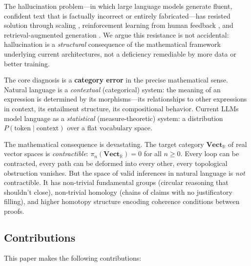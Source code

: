 \documentclass[11pt,a4paper,twocolumn]{article}
\theoremstyle{plain}
\theoremstyle{definition}
\newcommand{\Vect}{\mathbf{Vect}}
\begin{document}
The hallucination problem---in which large language models generate fluent, confident text that is factually incorrect or entirely fabricated---has resisted solution through scaling \cite{openai2023gpt4}, reinforcement learning from human feedback \cite{ouyang2022training}, and retrieval-augmented generation \cite{lewis2020retrieval}. We argue this resistance is not accidental: hallucination is a \emph{structural} consequence of the mathematical framework underlying current architectures, not a deficiency remediable by more data or better training.

The core diagnosis is a \textbf{category error} in the precise mathematical sense. Natural language is a \emph{contextual} (categorical) system: the meaning of an expression is determined by its morphisms---its relationships to other expressions in context, its entailment structure, its compositional behavior. Current LLMs model language as a \emph{statistical} (measure-theoretic) system: a distribution $P(\text{token} \mid \text{context})$ over a flat vocabulary space.

The mathematical consequence is devastating. The target category $\Vect_{\mathbb{R}}$ of real vector spaces is \emph{contractible}: $\pi_n(\Vect_{\mathbb{R}}) = 0$ for all $n \geq 0$. Every loop can be contracted, every path can be deformed into every other, every topological obstruction vanishes. But the space of valid inferences in natural language is \emph{not} contractible. It has non-trivial fundamental groups (circular reasoning that shouldn't close), non-trivial homology (chains of claims with no justificatory filling), and higher homotopy structure encoding coherence conditions between proofs.

\subsection{Contributions}

This paper makes the following contributions:
\end{document}
